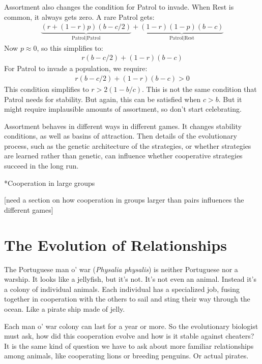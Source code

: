 \documentclass[10pt,reqno]{amsbook}
\makeatletter
\renewcommand\section{\@startsection{section}{1}
\z@{.7\linespacing\@plus\linespacing}{.5\linespacing}
{\large\bfseries\itshape}}
\numberwithin{equation}{chapter}
\makeatother
\begin{document}
Assortment also changes the condition for Patrol to invade. When Rest is common, it always gets zero. A rare Patrol gets:
\begin{align*}
	\underbrace{(r + (1-r)p)(b-c/2)}_{\text{Patrol|Patrol}} + \underbrace{(1-r)(1-p)(b-c)}_{\text{Patrol|Rest}} 
\end{align*}
Now $p \approx 0$, so this simplifies to:
\begin{align*}
	r(b-c/2)+ (1-r)(b-c)
\end{align*}
For Patrol to invade a population, we require:
\begin{align*}
	r(b-c/2)+ (1-r)(b-c) > 0
\end{align*}
This condition simplifies to $r > 2(1-b/c)$. This is not the same condition that Patrol needs for stability. But again, this can be satisfied when $c>b$. But it might require implausible amounts of assortment, so don't start celebrating.

Assortment behaves in different ways in different games. It changes stability conditions, as well as basins of attraction. Then details of the evolutionary process, such as the genetic architecture of the strategies, or whether strategies are learned rather than genetic, can influence whether cooperative strategies succeed in the long run.

\section*{Cooperation in large groups}

[need a section on how cooperation in groups larger than pairs influences the different games]


\def \chapterElement {R}
\chapter{The Evolution of Relationships}

The Portuguese man o' war (\emph{Physalia physalis}) is neither Portuguese nor a warship. It looks like a jellyfish, but it's not. It's not even an animal. Instead it's a colony of individual animals. Each individual has a specialized job, fusing together in cooperation with the others to sail and sting their way through the ocean. Like a pirate ship made of jelly.

Each man o' war colony can last for a year or more. So the evolutionary biologist must ask, how did this cooperation evolve and how is it stable against cheaters? It is the same kind of question we have to ask about more familiar relationships among animals, like cooperating lions or breeding penguins. Or actual pirates.
\end{document}

